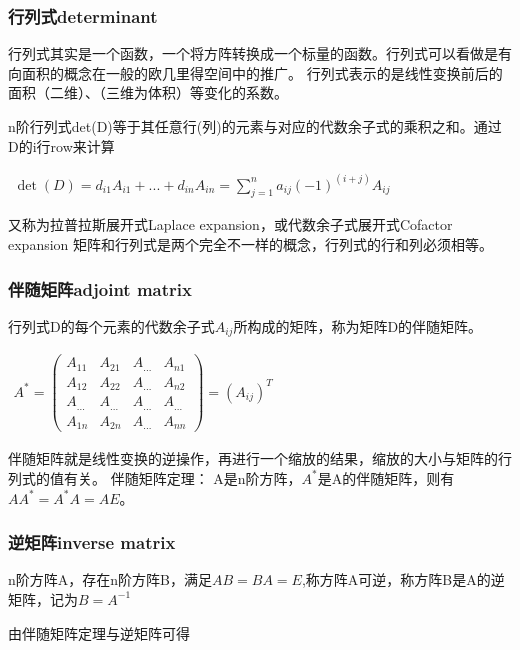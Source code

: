 \subsubsection{行列式determinant}
行列式其实是一个函数，一个将方阵转换成一个标量的函数。行列式可以看做是有向面积的概念在一般的欧几里得空间中的推广。
行列式表示的是线性变换前后的面积（二维）、（三维为体积）等变化的系数。

n阶行列式det(D)等于其任意行(列)的元素与对应的代数余子式的乘积之和。通过D的i行row来计算

\begin{math}
    \begin{aligned}
   \det(D)=d_{i1}A_{i1}+...+d_{in}A_{in}=\sum_{j=1}^{n}{a_{ij}(-1)^{(i+j)}A_{ij}}
    \end{aligned}
\end{math}

又称为拉普拉斯展开式Laplace expansion，或代数余子式展开式Cofactor expansion
矩阵和行列式是两个完全不一样的概念，行列式的行和列必须相等。

\subsubsection{伴随矩阵adjoint matrix}
行列式D的每个元素的代数余子式$A_{ij}$所构成的矩阵，称为矩阵D的伴随矩阵。

\begin{math}
    \begin{aligned}
A^{*}= \begin{pmatrix} A_{11}&A_{21}&A_{...}&A_{n1} \\
A_{12}&A_{22}&A_{...}&A_{n2} \\
A_{...}&A_{...}&A_{...}&A_{...} \\
A_{1n}&A_{2n}&A_{...}&A_{nn} \end{pmatrix} = (A_{ij})^T
\end{aligned}
\end{math}

伴随矩阵就是线性变换的逆操作，再进行一个缩放的结果，缩放的大小与矩阵的行列式的值有关。
伴随矩阵定理：
A是n阶方阵，$A^*$是A的伴随矩阵，则有$AA^*=A^*A=AE$。

\subsubsection{逆矩阵inverse matrix}
n阶方阵A，存在n阶方阵B，满足$AB=BA=E$,称方阵A可逆，称方阵B是A的逆矩阵，记为$B=A^{-1}$

由伴随矩阵定理与逆矩阵可得


